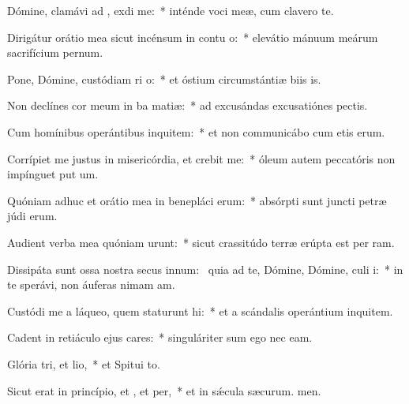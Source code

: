 \item Dómine, clamávi ad , exdi me:~* inténde voci meæ, cum clavero  te.
\item Dirigátur orátio mea sicut incénsum in contu o:~* elevátio mánuum meárum sacrifícium pernum.
\item Pone, Dómine, custódiam ri o:~* et óstium circumstántiæ biis is.
\item Non declínes cor meum in ba matiæ:~* ad excusándas excusatiónes  pectis.
\item Cum homínibus operántibus inquitem:~* et non communicábo cum etis erum.
\item Corrípiet me justus in misericórdia, et crebit me:~* óleum autem peccatóris non impínguet put um.
\item Quóniam adhuc et orátio mea in benepláci erum:~* absórpti sunt juncti petræ júdi erum.
\item Audient verba mea quóniam urunt:~* sicut crassitúdo terræ erúpta est per ram.
\item Dissipáta sunt ossa nostra secus innum:~\pscross{} quia ad te, Dómine, Dómine, culi i:~* in te sperávi, non áuferas nimam am.
\item Custódi me a láqueo, quem staturunt hi:~* et a scándalis operántium inquitem.
\item Cadent in retiáculo ejus cares:~* singuláriter sum ego nec eam.
\item Glória tri, et lio,~* et Spitui to.
\item Sicut erat in princípio, et , et per,~* et in sǽcula sæcurum. men.
